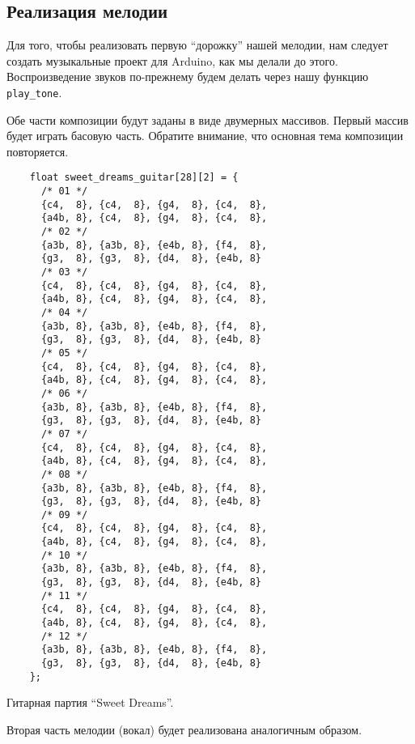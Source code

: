 \documentclass[../sparc.tex]{subfiles}
\begin{document}
\subsection{Реализация мелодии}

Для того, чтобы реализовать первую ``дорожку'' нашей мелодии, нам следует
создать музыкальные проект для Arduino, как мы делали до этого.  Воспроизведение
звуков по-прежнему будем делать через нашу функцию \texttt{play\_tone}.

Обе части композиции будут заданы в виде двумерных массивов.  Первый массив
будет играть басовую часть.  Обратите внимание, что основная тема композиции
повторяется.

\begin{listing}[H]
  \begin{verbatim}
    float sweet_dreams_guitar[28][2] = {
      /* 01 */
      {c4,  8}, {c4,  8}, {g4,  8}, {c4,  8},
      {a4b, 8}, {c4,  8}, {g4,  8}, {c4,  8},
      /* 02 */
      {a3b, 8}, {a3b, 8}, {e4b, 8}, {f4,  8},
      {g3,  8}, {g3,  8}, {d4,  8}, {e4b, 8}
      /* 03 */
      {c4,  8}, {c4,  8}, {g4,  8}, {c4,  8},
      {a4b, 8}, {c4,  8}, {g4,  8}, {c4,  8},
      /* 04 */
      {a3b, 8}, {a3b, 8}, {e4b, 8}, {f4,  8},
      {g3,  8}, {g3,  8}, {d4,  8}, {e4b, 8}
      /* 05 */
      {c4,  8}, {c4,  8}, {g4,  8}, {c4,  8},
      {a4b, 8}, {c4,  8}, {g4,  8}, {c4,  8},
      /* 06 */
      {a3b, 8}, {a3b, 8}, {e4b, 8}, {f4,  8},
      {g3,  8}, {g3,  8}, {d4,  8}, {e4b, 8}
      /* 07 */
      {c4,  8}, {c4,  8}, {g4,  8}, {c4,  8},
      {a4b, 8}, {c4,  8}, {g4,  8}, {c4,  8},
      /* 08 */
      {a3b, 8}, {a3b, 8}, {e4b, 8}, {f4,  8},
      {g3,  8}, {g3,  8}, {d4,  8}, {e4b, 8}
      /* 09 */
      {c4,  8}, {c4,  8}, {g4,  8}, {c4,  8},
      {a4b, 8}, {c4,  8}, {g4,  8}, {c4,  8},
      /* 10 */
      {a3b, 8}, {a3b, 8}, {e4b, 8}, {f4,  8},
      {g3,  8}, {g3,  8}, {d4,  8}, {e4b, 8}
      /* 11 */
      {c4,  8}, {c4,  8}, {g4,  8}, {c4,  8},
      {a4b, 8}, {c4,  8}, {g4,  8}, {c4,  8},
      /* 12 */
      {a3b, 8}, {a3b, 8}, {e4b, 8}, {f4,  8},
      {g3,  8}, {g3,  8}, {d4,  8}, {e4b, 8}
    };
  \end{verbatim}
  \label{listing:music-band-sweet-dreams-1}
  \caption{Гитарная партия ``Sweet Dreams''.}
\end{listing}

Вторая часть мелодии (вокал) будет реализована аналогичным образом.
\end{document}
